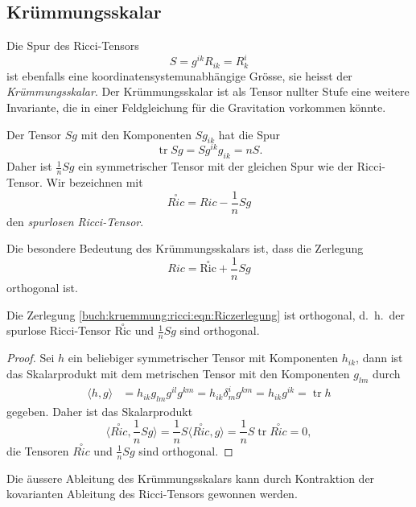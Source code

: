 %
%
\subsection{Krümmungsskalar}
Die Spur des Ricci-Tensors 
\[
S
=
g^{ik}R_{ik}
=
R^i_k
\]
ist ebenfalls eine koordinatensystemunabhängige Grösse, sie
heisst der {\em Krümmungsskalar}.
Der Krümmungsskalar ist als Tensor nullter Stufe eine weitere Invariante,
die in einer Feldgleichung für die Gravitation vorkommen könnte.

Der Tensor $Sg$ mit den Komponenten $Sg_{ik}$ hat die Spur
\[
\operatorname{tr} Sg
=
Sg^{ik}g_{ik}
=
nS.
\]
Daher ist $\frac1n Sg$ ein symmetrischer Tensor mit der gleichen
Spur wie der Ricci-Tensor. 
Wir bezeichnen mit
\[
\overset{\circ}{\textit{Ric}}
=
\textit{Ric} - \frac1n Sg
\]
%
den \emph{spurlosen Ricci-Tensor}.

Die besondere Bedeutung des Krümmungsskalars ist, dass die Zerlegung
\begin{equation}
Ric
=
\overset{\circ}{\text{Ric}} + \frac1n Sg
\label{buch:kruemmung:ricci:eqn:Riczerlegung}
\end{equation}
orthogonal ist.

\begin{satz}
Die Zerlegung \eqref{buch:kruemmung:ricci:eqn:Riczerlegung} ist
orthogonal, d.~h.~der spurlose Ricci-Tensor $\overset{\circ}{\text{Ric}}$
und $\frac1nSg$ sind orthogonal.
\end{satz}

\begin{proof}
Sei $h$ ein beliebiger symmetrischer Tensor mit Komponenten $h_{ik}$,
dann ist das Skalarprodukt mit dem metrischen Tensor mit den 
Komponenten $g_{lm}$ durch
\begin{align*}
\langle h,g\rangle
&=
h_{ik}g_{lm}
g^{il}g^{km}
=
h_{ik}\delta_m^i
g^{km}
=
h_{ik}g^{ik}
=
\operatorname{tr} h
\end{align*}
gegeben.
Daher ist das Skalarprodukt
\[
\langle \overset{\circ}{\textit{Ric}},\frac{1}n Sg \rangle
=
\frac1nS\langle\overset{\circ}{\textit{Ric}},g\rangle
=
\frac1nS\operatorname{tr}\overset{\circ}{\textit{Ric}}
=
0,
\]
die Tensoren $\overset{\circ}{\textit{Ric}}$ und $\frac1nSg$ sind orthogonal.
\end{proof}

Die äussere Ableitung des Krümmungsskalars kann durch Kontraktion
der kovarianten Ableitung des Ricci-Tensors gewonnen werden.

